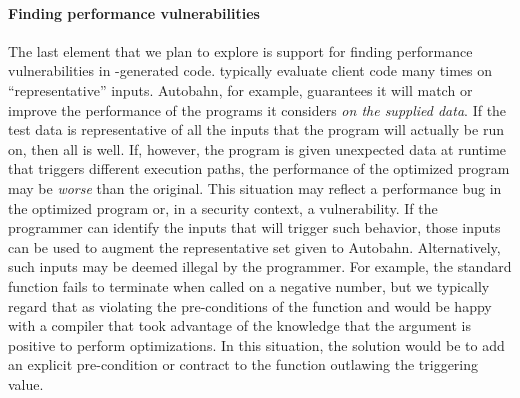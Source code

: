 \paragraph*{Finding performance vulnerabilities}
The last element that we plan to explore is support for finding performance vulnerabilities in
\rasp{}-generated code.
\rasps typically evaluate client code many times on ``representative'' inputs.
Autobahn, for example, guarantees it will match or improve the
performance of the programs it considers
\textit{on the supplied data}.  If the test data is representative of
all the inputs that the program will actually be run on, then all is
well. If, however, the program is given unexpected data at runtime
that triggers different execution paths, the performance of the
optimized program may be \textit{worse} than the original.
This situation may reflect a performance bug in the optimized
program or, in a security context, a vulnerability.  
If the programmer can identify the inputs that will trigger such behavior,
those inputs can be used to augment the
representative set given to Autobahn.  Alternatively, such inputs may be
deemed illegal by the programmer. For example, the standard 
function fails to terminate when called on a negative number, but we
typically regard that as violating the pre-conditions of the function
and would be happy with a compiler that took advantage of the
knowledge that the argument is positive to perform optimizations.  In
this situation, the solution would be to add an explicit pre-condition
or contract to the function outlawing the triggering value.

